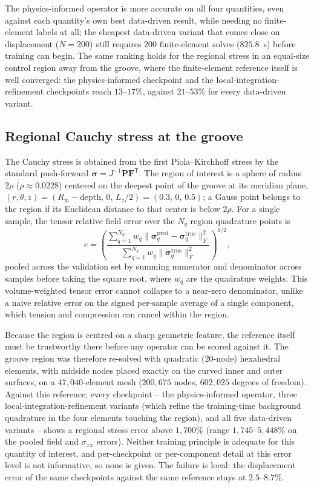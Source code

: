 \documentclass[final,5p,times]{elsarticle}
\begin{document}
The physics-informed operator is more accurate on all four quantities,
even against each quantity's own best data-driven result, while needing
no finite-element labels at all; the cheapest data-driven variant that
comes close on displacement ($N{=}200$) still requires $200$
finite-element solves ($825.8$~s) before training can begin. The same
ranking holds for the regional stress in an equal-size control region
away from the groove, where the finite-element reference itself is
well converged: the physics-informed checkpoint and the
local-integration-refinement checkpoints reach $13$--$17\%$, against
$21$--$53\%$ for every data-driven variant.

\subsection{Regional Cauchy stress at the groove}
\label{sec:b3-stress}
The Cauchy stress is obtained from the first Piola--Kirchhoff stress by
the standard push-forward $\boldsymbol{\sigma} = J^{-1}\mathbf{P}\mathbf{F}^{\mathsf T}$.
The region of interest is a sphere of radius $2\rho$ ($\rho\approx0.0228$)
centered on the deepest point of the
groove at its meridian plane, $(r,\theta,z) = (R_{\text{in}}-\text{depth},\,
0,\,L_z/2) = (0.3,\,0,\,0.5)$; a Gauss point belongs to the region if its
Euclidean distance to that center is below $2\rho$. For a single sample,
the tensor relative field error over the $N_q$ region quadrature points is
\begin{equation}
  e = \left(\frac{\sum_{q=1}^{N_q} w_q \lVert \boldsymbol{\sigma}^{\text{pred}}_q - \boldsymbol{\sigma}^{\text{true}}_q \rVert_F^2}
  {\sum_{q=1}^{N_q} w_q \lVert \boldsymbol{\sigma}^{\text{true}}_q \rVert_F^2}\right)^{1/2},
  \label{eq:region-field-error}
\end{equation}
pooled across the validation set by summing numerator and denominator
across samples before taking the square root, where $w_q$ are the
quadrature weights. This volume-weighted tensor error cannot collapse to
a near-zero denominator, unlike a naive relative error on the signed
per-sample average of a single component, which tension and compression
can cancel within the region.

Because the region is centred on a sharp geometric feature, the reference
itself must be trustworthy there before any operator can be scored
against it. The groove region was therefore re-solved with quadratic
(20-node) hexahedral elements, with midside nodes placed exactly on the
curved inner and outer surfaces, on a $47{,}040$-element mesh
($200{,}675$ nodes, $602{,}025$ degrees of freedom). Against this
reference, every checkpoint -- the physics-informed operator, three
local-integration-refinement variants (which refine the training-time
background quadrature in the four elements touching the region), and all
five data-driven variants -- shows a regional stress error above
$1{,}700\%$ (range $1{,}745$--$5{,}448\%$ on the pooled field and
$\sigma_{xx}$ errors). Neither training principle is adequate for this
quantity of interest, and per-checkpoint or per-component detail at this
error level is not informative, so none is given. The failure is
local: the displacement error of the same checkpoints against the same
reference stays at $2.5$--$8.7\%$.
\end{document}
